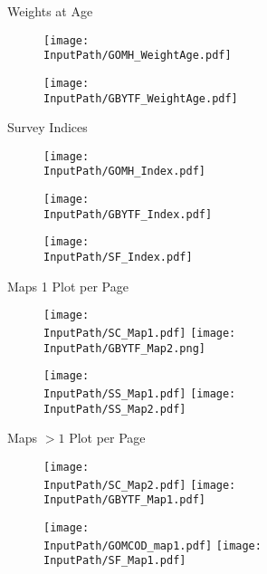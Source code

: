 \documentclass[]{report}
\begin{document}
\renewcommand{\Mwidth}{0.6\textwidth}
\Huge{Weights at Age}
\begin{figure}[!htb]
    \begin{minipage}{\Mwidth}
        \centering
        \texttt{[image: \\InputPath/GOMH\_WeightAge.pdf]}
    \end{minipage}%
    \begin{minipage}{\Mwidth}
        \centering
        \texttt{[image: \\InputPath/GBYTF\_WeightAge.pdf]}
    \end{minipage}
\end{figure}
\clearpage



\renewcommand{\Mwidth}{0.6\textwidth}
\Huge{Survey Indices}
\begin{figure}[!htb]
    \begin{minipage}{\Mwidth}
        \centering
        \texttt{[image: \\InputPath/GOMH\_Index.pdf]}
    \end{minipage}%
    \begin{minipage}{\Mwidth}
        \centering
        \texttt{[image: \\InputPath/GBYTF\_Index.pdf]}
    \end{minipage}
    \begin{minipage}{\Mwidth}
        \centering
        \texttt{[image: \\InputPath/SF\_Index.pdf]}
    \end{minipage}
\end{figure}
\clearpage

\renewcommand{\Mwidth}{0.5\textwidth}
\Huge{Maps 1 Plot per Page}
\begin{figure}[!htb]
    \begin{minipage}{\Mwidth}
        \centering
        \texttt{[image: \\InputPath/SC\_Map1.pdf]}
    	\texttt{[image: \\InputPath/GBYTF\_Map2.png]}
    \end{minipage}%
    \begin{minipage}{\Mwidth}
        \centering
    	\texttt{[image: \\InputPath/SS\_Map1.pdf]}
        \texttt{[image: \\InputPath/SS\_Map2.pdf]}
    \end{minipage}    
\end{figure}
\clearpage

\renewcommand{\Mwidth}{0.5\textwidth}
\Huge{Maps $>1$ Plot per Page}
\begin{figure}[!htb]
    \begin{minipage}{\Mwidth}
        \centering
        \texttt{[image: \\InputPath/SC\_Map2.pdf]}
    	\texttt{[image: \\InputPath/GBYTF\_Map1.pdf]}
    \end{minipage}%
    \begin{minipage}{\Mwidth}
        \centering
        \texttt{[image: \\InputPath/GOMCOD\_map1.pdf]}
    	\texttt{[image: \\InputPath/SF\_Map1.pdf]}
    \end{minipage}    
\end{figure}
\clearpage
\end{document}
